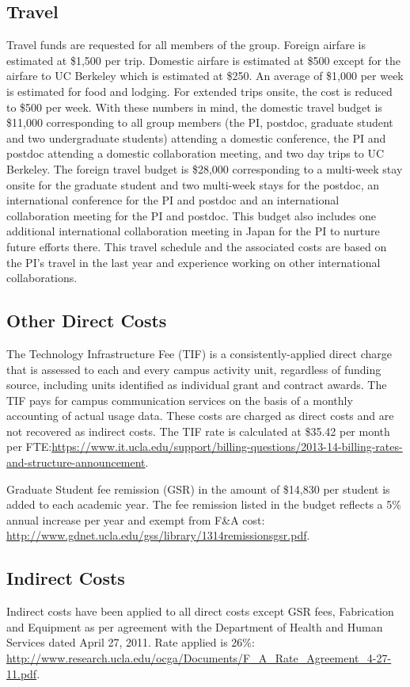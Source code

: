 \subsection{Travel}
Travel funds are requested for all members of the group. Foreign airfare is estimated at \$1,500 per trip. Domestic airfare is estimated at \$500 except for the airfare to UC Berkeley which is estimated at \$250. An average of \$1,000 per week is estimated for food and lodging. For extended trips onsite, the cost is reduced to \$500 per week. With these numbers in mind, the domestic travel budget is \$11,000 corresponding to all group members (the PI, postdoc, graduate student and two undergraduate students) attending a domestic conference, the PI and postdoc attending a domestic collaboration meeting, and two day trips to UC Berkeley. The foreign travel budget is \$28,000 corresponding to a multi-week stay onsite for the graduate student and two multi-week stays for the postdoc, an international conference for the PI and postdoc and an international collaboration meeting for the PI and postdoc. This budget also includes one additional international collaboration meeting in Japan for the PI to nurture future efforts there. This travel schedule and the associated costs are based on the PI's travel in the last year and experience working on other international collaborations.


\subsection{Other Direct Costs}
The Technology Infrastructure Fee (TIF) is a consistently-applied direct charge that is assessed to each and every campus activity unit, regardless of funding source, including units identified as individual grant and contract awards. The TIF pays for campus communication services on the basis of a monthly accounting of actual usage data. These costs are charged as direct costs and are not recovered as indirect costs. The TIF rate is calculated at \$35.42 per month per FTE:\url{https://www.it.ucla.edu/support/billing-questions/2013-14-billing-rates-and-structure-announcement}.

Graduate Student fee remission (GSR) in the amount of \$14,830 per student is added to each academic year. The fee remission listed in the budget reflects a 5\% annual increase per year and  exempt from F\&A cost: \url{http://www.gdnet.ucla.edu/gss/library/1314remissionsgsr.pdf}.


\subsection{Indirect Costs}
Indirect costs have been applied to all direct costs except GSR fees, Fabrication and Equipment as per agreement with the Department of Health and Human Services dated April 27, 2011. Rate applied is 26\%: \url{http://www.research.ucla.edu/ocga/Documents/F_A_Rate_Agreement_4-27-11.pdf}.

